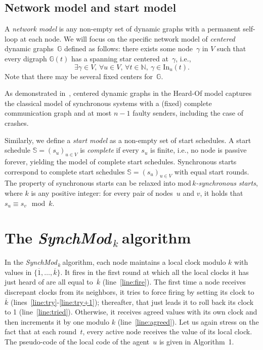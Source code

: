 \documentclass{article}
\newcommand{\cent}{\gamma}
\newcommand{\dG}{\mathds{G}}
\newcommand{\IS}{\mathds{S}}
\newcommand{\In}{\mathrm{In}}
\newcommand{\SM}{{\em SynchMod}$_{\,k}\ $}
\begin{document}
\subsection{Network model and start model}

A \emph{network model} is any non-empty set of dynamic graphs with a permanent self-loop at each node.
We will focus on the specific network model of \emph{centered} dynamic graphs~$\dG$ defined as follows: 
	there exists some node~$\cent$ in $V$ such that every digraph $\dG(t)$ has a spanning star centered 
	at~$\cent$, i.e., 
	$$\exists \cent \in V, \, \forall u \in V, \, \forall t \in \mathds{N}, \ \cent \in \In_u(t) .$$
Note that there may be several fixed centers for~$\dG$.

As demonstrated in~\cite{CBS09}, centered dynamic graphs in the Heard-Of model captures the
	classical model of synchronous systems with a (fixed) complete communication graph and 
	 at most $n-1$ faulty senders, including the case of crashes.

Similarly, we define a \emph{start model} as a non-empty set of start schedules.
A start schedule $\IS = (s_u)_{u\in V}$ is \emph{complete} if every $s_u$ is finite, i.e.,
	no node is passive forever, yielding the model of complete start schedules.
Synchronous starts correspond to complete start schedules $\IS = (s_u)_{u\in V}$ with
	equal start rounds.	
The property of synchronous starts can be relaxed into \emph{$\mathrm{mod}\,k$-synchronous starts},
	where $k$ is any positive integer: for every pair of nodes~$u$ and $v$, it holds that $s_u \equiv s_v \!\mod k$.

\section{The \SM algorithm}

In the \SM algorithm, each node  maintains a local clock modulo $k$ with values in $\{ \overline{1}, \dots,  \overline{k} \}$.
It fires in the first round at which all the local clocks it has just heard of  are all equal to~$\overline{k} $ (line~\ref{line:fire}).
The first time a node receives discrepant clocks from its neighbors, it tries to force firing  by setting its clock to  $\overline{k} $
	(lines~\ref{line:try}-\ref{line:try+1});
	thereafter, that  just leads it to roll back its clock to 1 (line~\ref{line:tried}).
Otherwise, it receives agreed values with its own clock and then increments it by one modulo $k$ (line~\ref{line:agreed}).
Let us again stress on the fact that at each round~$t$, every active node receives the value of its local clock.
The pseudo-code of the local code of the agent~$u$ is given in Algorithm~1.
\end{document}
